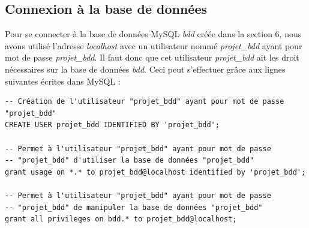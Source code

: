 \documentclass[a4paper,10pt]{article}
\begin{document}
\subsection{Connexion à la base de données}

Pour se connecter à la base de données MySQL \textsl{bdd} créée dans la section 6, nous avons utilisé l'adresse \textsl{localhost} avec un utilisateur nommé \textsl{projet\_bdd} ayant pour mot de passe \textsl{projet\_bdd}. Il faut donc que cet utilisateur \textsl{projet\_bdd} ait les droit nécessaires sur la base de données \textsl{bdd}. Ceci peut s'effectuer grâce aux lignes suivantes écrites dans MySQL :

\begin{verbatim}
-- Création de l'utilisateur "projet_bdd" ayant pour mot de passe "projet_bdd"
CREATE USER projet_bdd IDENTIFIED BY 'projet_bdd'; 

-- Permet à l'utilisateur "projet_bdd" ayant pour mot de passe 
-- "projet_bdd" d'utiliser la base de données "projet_bdd"
grant usage on *.* to projet_bdd@localhost identified by 'projet_bdd';

-- Permet à l'utilisateur "projet_bdd" ayant pour mot de passe 
-- "projet_bdd" de manipuler la base de données "projet_bdd"
grant all privileges on bdd.* to projet_bdd@localhost; 
\end{verbatim}
\end{document}
